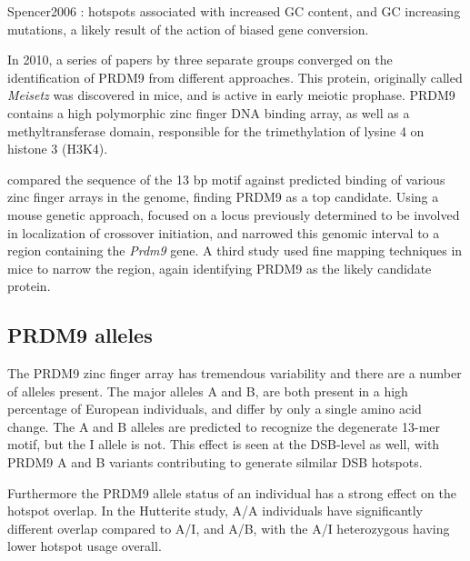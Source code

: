 Spencer2006 : hotspots associated with increased GC content, and GC increasing mutations, a likely result of the action of biased gene conversion.


In 2010, a series of papers by three separate groups converged on the identification of PRDM9 from different approaches.
This protein, originally called \textit{Meisetz} was discovered in mice, and is active in early meiotic prophase\cite{Hayashi2005}.
PRDM9 contains a high polymorphic zinc finger DNA binding array, as well as a methyltransferase domain, responsible for the trimethylation of lysine 4 on histone 3 (H3K4).

\citet{Myers2010} compared the sequence of the 13 bp motif against predicted binding of various zinc finger arrays in the genome, finding PRDM9 as a top candidate.
Using a mouse genetic approach, \citet{Baudat2010} focused on a locus previously determined to be involved in localization of crossover initiation\cite{Grey2009,Parvanov2009},
and narrowed this genomic interval to a region containing the \textit{Prdm9} gene.
A third study used fine mapping techniques in mice to narrow the region, again identifying PRDM9 as the likely candidate protein\cite{Parvanov2010}.

\subsection{PRDM9 alleles}

The PRDM9 zinc finger array has tremendous variability and there are a number of alleles present.
The major alleles A and B, are both present in a high percentage of European individuals, and differ by only a single amino acid change\cite{Baudat2010}.
The A and B alleles are predicted to recognize the degenerate 13-mer motif, but the I allele is not\cite{Baudat2010}.
This effect is seen at the DSB-level as well, with PRDM9 A and B variants contributing to generate silmilar DSB hotspots\cite{Pratto2014}.

Furthermore the PRDM9 allele status of an individual has a strong effect on the hotspot overlap.
In the Hutterite study, A/A individuals have significantly different overlap compared to A/I, and A/B, with the A/I heterozygous having lower hotspot usage overall\cite{Baudat2010}.


